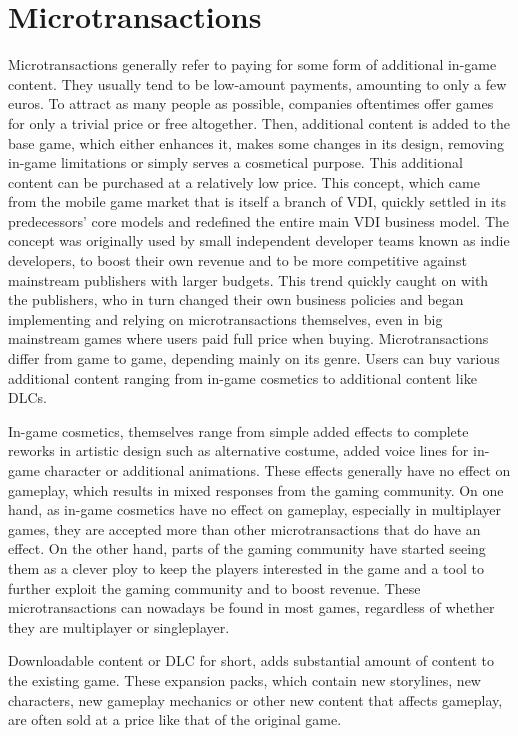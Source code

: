\documentclass[10pt,british,a4paper,titlepage]{article}
\begin{document}
\section{Microtransactions}

Microtransactions generally refer to paying for some form of additional in-game content. They usually tend to be low-amount payments, amounting to only a few euros. To attract as many people as possible, companies oftentimes offer games for only a trivial price or free altogether. Then, additional content is added to the base game, which either enhances it, makes some changes in its design, removing in-game limitations or simply serves a cosmetical purpose. This additional content can be purchased at a relatively low price. This concept, which came from the mobile game market that is itself a branch of VDI, quickly settled in its predecessors’ core models and redefined the entire main VDI business model. The concept was originally used by small independent developer teams known as indie developers, to boost their own revenue and to be more competitive against mainstream publishers with larger budgets. This trend quickly caught on with the publishers, who in turn changed their own business policies and began implementing and relying on microtransactions themselves, even in big mainstream games where users paid full price when buying. Microtransactions differ from game to game, depending mainly on its genre. Users can buy various additional content ranging from in-game cosmetics to additional content like DLCs. 

In-game cosmetics, themselves range from simple added effects to complete reworks in artistic design such as alternative costume, added voice lines for in-game character or additional animations. These effects generally have no effect on gameplay, which results in mixed responses from the gaming community. On one hand, as in-game cosmetics have no effect on gameplay, especially in multiplayer games, they are accepted more than other microtransactions that do have an effect. On the other hand, parts of the gaming community have started seeing them as a clever ploy to keep the players interested in the game and  a tool to further exploit the gaming community and to boost revenue. These microtransactions can nowadays be found in most games, regardless of whether they are multiplayer or singleplayer. 

Downloadable content or DLC for short, adds substantial amount of content to the existing game. These expansion packs, which contain new storylines, new characters, new gameplay mechanics or other new content that affects gameplay, are often sold at a price like that of the original game. 
\end{document}
